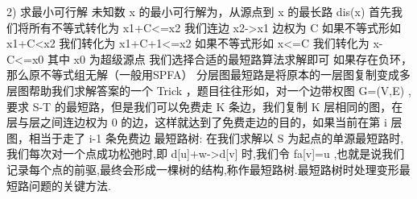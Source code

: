 {}\markdownRendererDollarSign{} 2) \markdownRendererDollarSign{}求最小可行解\markdownRendererParagraphSeparator
{}未知数\markdownRendererDollarSign{} x \markdownRendererDollarSign{}的最小可行解为，从源点到\markdownRendererDollarSign{} x \markdownRendererDollarSign{}的最长路\markdownRendererDollarSign{} dis(x) \markdownRendererDollarSign{}\markdownRendererParagraphSeparator
{}首先我们将所有不等式转化为\markdownRendererDollarSign{} x1+C<=x2 \markdownRendererDollarSign{} 我们连边\markdownRendererDollarSign{} x2->x1 \markdownRendererDollarSign{} 边权为\markdownRendererDollarSign{} C \markdownRendererDollarSign{}\markdownRendererParagraphSeparator
{}如果不等式形如\markdownRendererDollarSign{} x1+C<x2 \markdownRendererDollarSign{} 我们转化为\markdownRendererDollarSign{} x1+C+1<=x2 \markdownRendererDollarSign{}\markdownRendererParagraphSeparator
{}如果不等式形如\markdownRendererDollarSign{} x<=C \markdownRendererDollarSign{} 我们转化为\markdownRendererDollarSign{} x-C<=x0\markdownRendererSoftLineBreak
{}\markdownRendererDollarSign{}其中\markdownRendererDollarSign{} x0 \markdownRendererDollarSign{}为超级源点\markdownRendererParagraphSeparator
{}我们选择合适的最短路算法求解即可 如果存在负环，那么原不等式组无解（一般用SPFA）\markdownRendererInterblockSeparator
{}
\markdownRendererSectionEnd \markdownRendererSectionBegin
{}\markdownRendererInterblockSeparator
{}分层图最短路是将原本的一层图复制变成多层图帮助我们求解答案的一个\markdownRendererDollarSign{} Trick \markdownRendererDollarSign{}，题目往往形如，对一个边带权图\markdownRendererDollarSign{} G=(V,E) \markdownRendererDollarSign{},要求\markdownRendererDollarSign{} S-T \markdownRendererDollarSign{}的最短路，但是我们可以免费走\markdownRendererDollarSign{} K \markdownRendererDollarSign{}条边，我们复制\markdownRendererDollarSign{} K \markdownRendererDollarSign{}层相同的图，在层与层之间连边权为\markdownRendererDollarSign{} 0 \markdownRendererDollarSign{}的边，这样就达到了免费走边的目的，如果当前在第\markdownRendererDollarSign{} i \markdownRendererDollarSign{}层图，相当于走了\markdownRendererDollarSign{} i-1\markdownRendererSoftLineBreak
{}\markdownRendererDollarSign{}条免费边\markdownRendererInterblockSeparator
{}
\markdownRendererSectionEnd \markdownRendererSectionBegin
{}\markdownRendererInterblockSeparator
{}最短路树:\markdownRendererParagraphSeparator
{}在我们求解以\markdownRendererDollarSign{} S \markdownRendererDollarSign{}为起点的单源最短路时,我们每次对一个点成功松弛时,即\markdownRendererDollarSign{} d[u]+w->d[v] \markdownRendererDollarSign{}时,我们令\markdownRendererDollarSign{} fa[v]=u \markdownRendererDollarSign{},也就是说我们记录每个点的前驱,最终会形成一棵树的结构,称作最短路树.最短路树时处理变形最短路问题的关键方法.\markdownRendererParagraphSeparator
